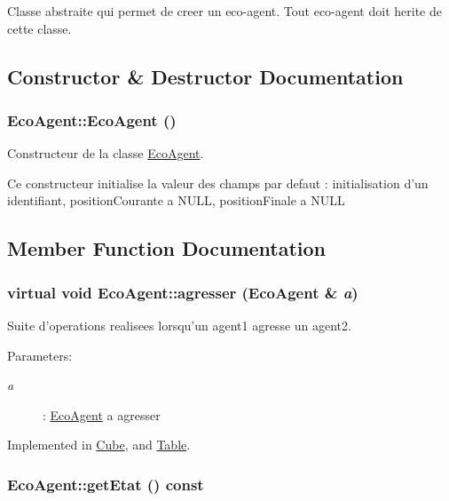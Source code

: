 Classe abstraite qui permet de creer un eco-agent. Tout eco-agent doit herite de cette classe. 

\subsection{Constructor \& Destructor Documentation}
\hypertarget{classEcoAgent_a0d07e98fbbb24b69a7d5d7fc0a75d2b}{
\subsubsection[{EcoAgent}]{\setlength{\rightskip}{0pt plus 5cm}EcoAgent::EcoAgent ()}}
\label{classEcoAgent_a0d07e98fbbb24b69a7d5d7fc0a75d2b}


Constructeur de la classe \hyperlink{classEcoAgent}{EcoAgent}. 

Ce constructeur initialise la valeur des champs par defaut : initialisation d'un identifiant, positionCourante a NULL, positionFinale a NULL 

\subsection{Member Function Documentation}
\hypertarget{classEcoAgent_867f0c274eb3ed0b61cb1fe7baa67edd}{
\subsubsection[{agresser}]{\setlength{\rightskip}{0pt plus 5cm}virtual void EcoAgent::agresser ({\bf EcoAgent} \& {\em a})}}
\label{classEcoAgent_867f0c274eb3ed0b61cb1fe7baa67edd}


Suite d'operations realisees lorsqu'un agent1 agresse un agent2. 

\begin{Desc}
\item[Parameters:]
\begin{description}
\item[{\em a}]: \hyperlink{classEcoAgent}{EcoAgent} a agresser \end{description}
\end{Desc}


Implemented in \hyperlink{classCube_85556598281efcfa925dd4ef4c8acba5}{Cube}, and \hyperlink{classTable_e636451a26e8fd61aa9b4c09a92262f7}{Table}.\hypertarget{classEcoAgent_91160732f8c4dd585ac5d8ad69bf3891}{
\subsubsection[{getEtat}]{ EcoAgent::getEtat () const}}
\label{classEcoAgent_91160732f8c4dd585ac5d8ad69bf3891}


